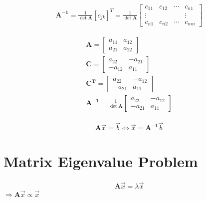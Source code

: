 \begin{myTheorem}
	\begin{eqnarray}
		\mathbf{A^{-1}}=\frac{1}{\det \mathbf{A}}[c_{jk}]^{T}
		=\frac{1}{\det \mathbf{A}}
		\begin{bmatrix}
			c_{11} & c_{12} & \cdots & c_{n1}\\
			\vdots & & & \vdots\\
			c_{n1} & c_{n2} & \cdots & c_{nm}
		\end{bmatrix}
	\end{eqnarray}
\end{myTheorem}

\begin{myExample}
	\begin{eqnarray*}
		\textbf{A}=
		\begin{bmatrix}
			a_{11} &a_{12}\\
			a_{21} & a_{22}
		\end{bmatrix}
		\\
		\mathbf{C}=
		\begin{bmatrix}
			a_{22} &-a_{21}\\
			-a_{12} & a_{11}
		\end{bmatrix}
		\\
		\mathbf{C^T}=
		\begin{bmatrix}
			a_{22} &-a_{12}\\
			-a_{21} & a_{11}
		\end{bmatrix}
		\\
		\mathbf{A^{-1}}=
		\frac{1}{\det \mathbf{A}}
		\begin{bmatrix}
			a_{22} &-a_{12}\\
			-a_{21} & a_{11}
		\end{bmatrix}
	\end{eqnarray*}	
\end{myExample}

\begin{myDefinition}
	\begin{eqnarray}
		\mathbf{A}\overrightarrow x=\overrightarrow b
		\Leftrightarrow
		\overrightarrow x=\mathbf{A^{-1}}\overrightarrow b
	\end{eqnarray}
\end{myDefinition}

\chapter{Matrix Eigenvalue Problem}
\begin{myDefinition}
	\begin{eqnarray}
		\textbf{A}\overrightarrow x=\lambda\overrightarrow x
	\end{eqnarray}
	$\Rightarrow \textbf{A}\overrightarrow x\propto\overrightarrow x$
\end{myDefinition}


